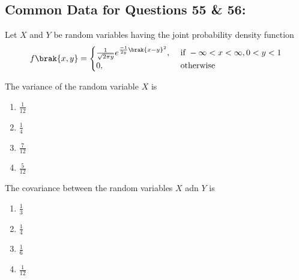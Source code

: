 \subsection*{Common Data for Questions 55 \& 56:}
Let $X$ and $Y$ be random variables having the joint probability density function
\begin{align*}
    f\brak{x,y} = 
    \begin{cases}
        \frac{1}{\sqrt{2 \pi y}} e^{\frac{-1}{2y}\brak{x-y}^2}, & \text{ if } -\infty < x < \infty, 0 < y < 1\\
        0, & \text{ otherwise }
    \end{cases}
\end{align*}
\item The variance of the random variable $X$ is
\begin{multicols}{2}
    \begin{enumerate}
        \item $\frac{1}{12}$
        \item $\frac{1}{4}$
        \item $\frac{7}{12}$
        \item $\frac{5}{12}$
    \end{enumerate}
\end{multicols}
\item The covariance between the random variables $X$ adn $Y$ is
\begin{multicols}{2}
    \begin{enumerate}
        \item $\frac{1}{3}$
        \item $\frac{1}{4}$
        \item $\frac{1}{6}$
        \item $\frac{1}{12}$
    \end{enumerate}
\end{multicols}

